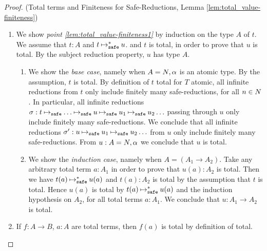 \begin{proof}(Total terms and Finiteness for Safe-Reductions, Lemma \ref{lem:total_value-finiteness})
\begin{enumerate}
\item
  We show \emph{point \ref{lem:total_value-finiteness1}}  by induction on the type $A$ of $t$. 
  We assume that $t:A$ and $t \mathbin{\mathbin{\mapsto}_{\hbox{\scriptsize \tt safe}}^*} u$.
  and $t$ is total, in order to prove that $u$ is total.
  By the subject reduction property, $u$ has type $A$.
\begin{enumerate}
\item
  We show the \emph{base case}, namely when $A ={N},\alpha$ is an atomic type.
  By the assumption, $t$ is total.
  By definition of $t$ total for $T$ atomic, all infinite 
  reductions from $t$ only include finitely many safe-reductions, for all $n \in {N}$.
  In particular, all infinite reductions $\sigma: t \mathbin{\mathbin{\mapsto}_{\hbox{\scriptsize \tt safe}}} \ldots \mathbin{\mathbin{\mapsto}_{\hbox{\scriptsize \tt safe}}} 
  u \mathbin{\mathbin{\mapsto}_{\hbox{\scriptsize \tt safe}}} u_1 \mathbin{\mathbin{\mapsto}_{\hbox{\scriptsize \tt safe}}} u_2 \ldots$ 
  passing through $u$ only include finitely many safe-reductions. We conclude that
  all infinite reductions 
  $\sigma': u \mathbin{\mathbin{\mapsto}_{\hbox{\scriptsize \tt safe}}} u_1 \mathbin{\mathbin{\mapsto}_{\hbox{\scriptsize \tt safe}}} u_2 \ldots$  from $u$
  only include finitely many safe-reductions. 
  From $u:A ={N},\alpha$ we conclude that  $u$ is total.
  
\item
  We show the \emph{induction case}, namely when $A = (A_1\rightarrow A_2)$.
  Take any arbitrary total term $a:A_1$ in order to prove that $u(a):A_2$ is total. 
  Then we have $t(a) \mathbin{\mathbin{\mapsto}_{\hbox{\scriptsize \tt safe}}^*} u(a)$ and 
  $t(a):A_2$ is total by the assumption that $t$ is total.
  Hence $u(a)$ is total by $t(a) \mathbin{\mathbin{\mapsto}_{\hbox{\scriptsize \tt safe}}^*} u(a)$ and the induction hypothesis on $A_2$,
  for all total terms $a:A_1$. 
  We conclude that $u:A_1\rightarrow A_2$ is total. 
\end{enumerate}

  \item
If $f:A \rightarrow B$, $a:A$ are total  terms, then $f(a)$  is total by definition of total.


\end{enumerate}
\end{proof}
